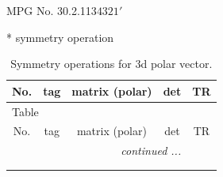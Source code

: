 \documentclass[fleqn,8pt]{jsarticle}
\begin{document}
\setcounter{MaxMatrixCols}{32}

\renewcommand{\tablename}{Table~}
\renewcommand{\figurename}{Figure~}
\begin{center}
\LARGE
MPG No. 30.2.113\quad$4321'$
\end{center}
* symmetry operation
\renewcommand{\arraystretch}{1.3}
\begin{longtable}{ccccc}
\caption{Symmetry operations for 3d polar vector.}
 \\
 \hline \hline
No. & tag & matrix (polar) & det & TR \\ \hline \endfirsthead

\multicolumn{4}{l}{\tablename\ \thetable{}} \\
 \hline \hline
No. & tag & matrix (polar) & det & TR \\ \hline \endhead

 \hline \hline
\multicolumn{4}{r}{\footnotesize\it continued ...} \\ \endfoot

 \hline \hline
\multicolumn{4}{r}{} \\ \endlastfoot


\end{longtable}
\end{document}
